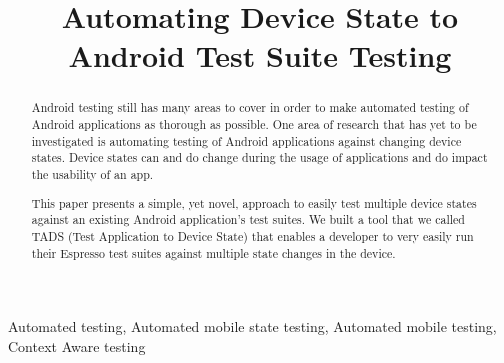 \documentclass[conference]{IEEEtran}
\begin{document}
	
\title{Automating Device State to Android Test Suite Testing }
\IEEEpubid{}

\author{
	\and

}


\maketitle



\begin{abstract}
Android testing still has many areas to cover in order to make automated testing of Android applications as thorough as possible.  One area of research that has yet to be investigated is automating testing of Android applications against changing device states.  Device states can and do change during the usage of applications and do impact the usability of an app.

This paper presents a simple, yet novel, approach to easily test multiple device states against an existing Android application's test suites.  We built a tool that we called TADS (Test Application to Device State) that enables a developer to very easily run their Espresso test suites against multiple state changes in the device.  
\end{abstract}



\begin{IEEEkeywords}
	Automated testing, Automated mobile state testing, Automated mobile testing, Context Aware testing
\end{IEEEkeywords}	

\IEEEpubidadjcol





 

	
\end{document}
